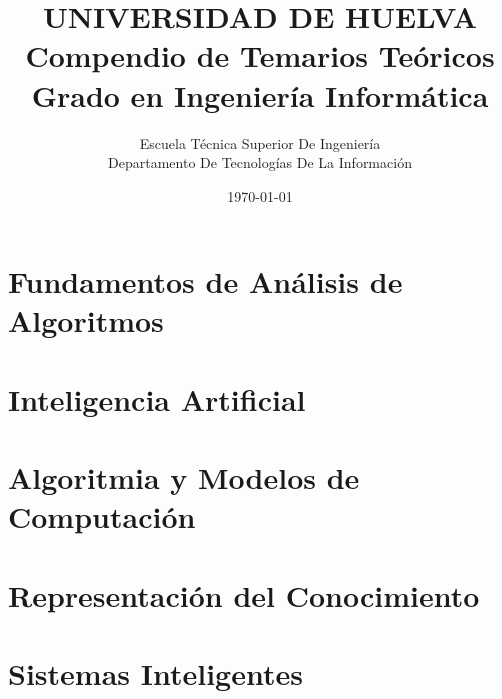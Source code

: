 \documentclass[11pt, a4paper]{report}
\title{%
    \vspace*{2cm}
    {\Large UNIVERSIDAD DE HUELVA}\\[0.5cm] 
    {\huge \textbf{Compendio de Temarios Teóricos}}\\[0.5cm]
    {\Large Grado en Ingeniería Informática}\\[2cm]
}
\author{%
    \vspace{1cm}
    Escuela Técnica Superior De Ingeniería\\[0.5cm]
    Departamento De Tecnologías De La Información \\[0.5cm]
}
\date{%
    \vspace{2cm}
    \large \today
}
\begin{document}


\tableofcontents
\newpage

\part{Fundamentos de Análisis de Algoritmos}



\part{Inteligencia Artificial}


\part{Algoritmia y Modelos de Computación}



\part{Representación del Conocimiento}


\part{Sistemas Inteligentes}







\end{document}
